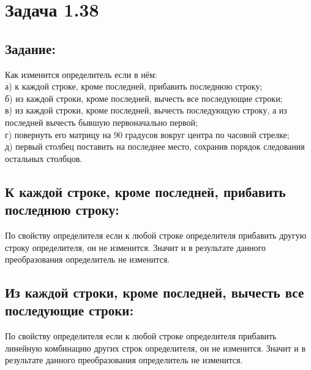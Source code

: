 \section{Задача 1.38}
\subsection{Задание:}
Как изменится определитель если в нём:\\
а) к каждой строке, кроме последней, прибавить последнюю строку;\\
б) из каждой строки, кроме последней, вычесть все последующие строки;\\
в) из каждой строки, кроме последней, вычесть последующую строку, а из последней вычесть бывшую первоначально первой;\\
г) повернуть его матрицу на $ 90 $ градусов вокруг центра по часовой стрелке;\\
д) первый столбец поставить на последнее место, сохранив порядок следования остальных столбцов.\\
\subsection{К каждой строке, кроме последней, прибавить последнюю строку:}
По свойству определителя если к любой строке определителя прибавить другую строку определителя, он не изменится.
Значит и в результате данного преобразования определитель не изменится.
\subsection{Из каждой строки, кроме последней, вычесть все последующие строки:}
По свойству определителя если к любой строке определителя прибавить линейную комбинацию других строк определителя, он не изменится.
Значит и в результате данного преобразования определитель не изменится.
